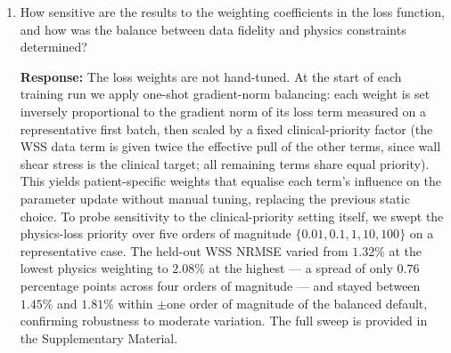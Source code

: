 \documentclass[11pt]{article}
\begin{document}
\begin{enumerate}[]
    \textbf{Response:} We have expanded the related-work discussion to position the present PINN against three recent surrogate families: a POD--LSTM surrogate for patient-specific carotid artery stenosis (Barzegar Gerdroodbary \& Salavatidezfouli, \emph{J.~R.~Soc.~Interface}, 22:20240774, 2025), a comparison of linear (POD-based) and nonlinear (autoencoder-based) solution-manifold-reduction surrogates for cardiovascular FSI (Barzegar Gerdroodbary \& Salavatidezfouli, \emph{Comput.~Biol.~Med.}, 189:109959, 2025), and a POD-with-machine-learning surrogate for cerebral aneurysm hemodynamics (Rajhi et al., \emph{Sci.~Rep.}, 15:32335, 2025). Relative to these, the PINN used here has two structural advantages. First, the embedded Navier--Stokes and WSS-from-gradient residuals act as a physics regulariser that constrains the prediction in low-data regions --- in particular the near-wall layer of a stenosis, where data-only reduced-order models are most error-prone and where the clinically relevant WSS is defined. Second, PINN inference is mesh-free: the trained network predicts at arbitrary spatial coordinates without re-projection onto a fixed reduced basis or re-meshing, which is well suited to the irregular, patient-specific anatomies considered here. We have added this comparison explicitly to the Discussion.

    \item How sensitive are the results to the weighting coefficients in the loss function, and how was the balance between data fidelity and physics constraints determined?

    \textbf{Response:} The loss weights are not hand-tuned. At the start of each training run we apply one-shot gradient-norm balancing: each weight is set inversely proportional to the gradient norm of its loss term measured on a representative first batch, then scaled by a fixed clinical-priority factor (the WSS data term is given twice the effective pull of the other terms, since wall shear stress is the clinical target; all remaining terms share equal priority). This yields patient-specific weights that equalise each term's influence on the parameter update without manual tuning, replacing the previous static choice. To probe sensitivity to the clinical-priority setting itself, we swept the physics-loss priority over five orders of magnitude $\{0.01,0.1,1,10,100\}$ on a representative case. The held-out WSS NRMSE varied from $1.32\%$ at the lowest physics weighting to $2.08\%$ at the highest --- a spread of only $0.76$ percentage points across four orders of magnitude --- and stayed between $1.45\%$ and $1.81\%$ within $\pm$one order of magnitude of the balanced default, confirming robustness to moderate variation. The full sweep is provided in the Supplementary Material.


\end{enumerate}
\end{document}
